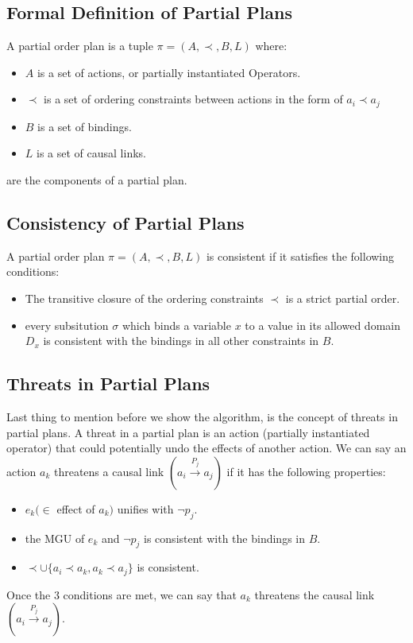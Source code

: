\subsection{Formal Definition of Partial Plans}
A partial order plan is a tuple $\pi = (A, \prec, B, L)$ where:
\begin{itemize}
  \item $A$ is a set of actions, or partially instantiated Operators.
  \item $\prec$ is a set of ordering constraints between actions in the form of $a_i \prec a_j$
  \item $B$ is a set of bindings.
  \item $L$ is a set of causal links.
\end{itemize}
are the components of a partial plan.



\subsection{Consistency of Partial Plans}
A partial order plan $\pi = (A, \prec, B, L)$ is consistent if it satisfies the following conditions:
\begin{itemize}
  \item The transitive closure of the ordering constraints $\prec$ is a strict partial order.
  \item every subsitution $\sigma $ which binds a variable $x$ to a value in its allowed domain $D_x$ is consistent with the bindings in all other constraints in $B$.
\end{itemize}

\subsection{Threats in Partial Plans}
Last thing to mention before we show the algorithm, is the concept of threats in partial plans.
A threat in a partial plan is an action (partially instantiated operator) that could potentially undo the effects of another action.
We can say an action $a_k$ threatens a causal link $(a_i \xrightarrow{\text{$P_j$}}  a_j)$ if it has the following properties:
\begin{itemize}
  \item $e_k (\in$ effect of $a_k)$ unifies with $\lnot p_j$.
  \item the MGU of $e_k$ and $\lnot p_j$ is consistent with the bindings in $B$.
  \item $\prec \cup \{a_i \prec a_k, a_k \prec a_j\}$ is consistent.
\end{itemize}
Once the 3 conditions are met, we can say that $a_k$ threatens the causal link \\$(a_i \xrightarrow{\text{$P_j$}}  a_j)$.


